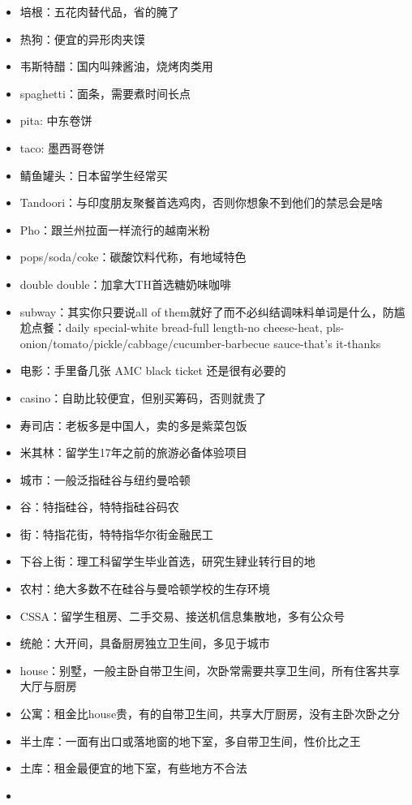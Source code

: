 \documentclass[]{tufte-book}
\begin{document}
\begin{itemize}
\item
  培根：五花肉替代品，省的腌了
\item
  热狗：便宜的异形肉夹馍
\item
  韦斯特醋：国内叫辣酱油，烧烤肉类用
\item
  spaghetti：面条，需要煮时间长点
\item
  pita: 中东卷饼
\item
  taco: 墨西哥卷饼
\item
  鲭鱼罐头：日本留学生经常买
\item
  Tandoori：与印度朋友聚餐首选鸡肉，否则你想象不到他们的禁忌会是啥
\item
  Pho：跟兰州拉面一样流行的越南米粉
\item
  pops/soda/coke：碳酸饮料代称，有地域特色
\item
  double double：加拿大TH首选糖奶味咖啡
\item
  subway：其实你只要说all of them就好了而不必纠结调味料单词是什么，防尴尬点餐：daily special-white bread-full length-no cheese-heat, pls-onion/tomato/pickle/cabbage/cucumber-barbecue sauce-that's it-thanks
\item
  电影：手里备几张 AMC black ticket 还是很有必要的
\item
  casino：自助比较便宜，但别买筹码，否则就贵了
\item
  寿司店：老板多是中国人，卖的多是紫菜包饭
\item
  米其林：留学生17年之前的旅游必备体验项目
\item
  城市：一般泛指硅谷与纽约曼哈顿
\item
  谷：特指硅谷，特特指硅谷码农
\item
  街：特指花街，特特指华尔街金融民工
\item
  下谷上街：理工科留学生毕业首选，研究生肄业转行目的地
\item
  农村：绝大多数不在硅谷与曼哈顿学校的生存环境
\item
  CSSA：留学生租房、二手交易、接送机信息集散地，多有公众号
\item
  统舱：大开间，具备厨房独立卫生间，多见于城市
\item
  house：别墅，一般主卧自带卫生间，次卧常需要共享卫生间，所有住客共享大厅与厨房
\item
  公寓：租金比house贵，有的自带卫生间，共享大厅厨房，没有主卧次卧之分
\item
  半土库：一面有出口或落地窗的地下室，多自带卫生间，性价比之王
\item
  土库：租金最便宜的地下室，有些地方不合法
\item

\end{itemize}
\end{document}
